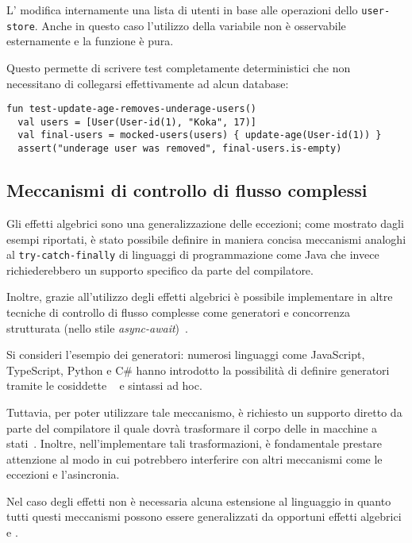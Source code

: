 L' modifica internamente una lista di utenti in base alle operazioni dello \lstinline{user-store}. Anche in questo caso l'utilizzo della variabile non è osservabile esternamente e la funzione è pura.

Questo permette di scrivere test completamente deterministici che non necessitano di collegarsi effettivamente ad alcun database:
\begin{lstlisting}[language=koka]
fun test-update-age-removes-underage-users()
  val users = [User(User-id(1), "Koka", 17)]
  val final-users = mocked-users(users) { update-age(User-id(1)) }
  assert("underage user was removed", final-users.is-empty)
\end{lstlisting}

\subsection{Meccanismi di controllo di flusso complessi}
Gli effetti algebrici sono una generalizzazione delle eccezioni; come mostrato dagli esempi riportati, è stato possibile definire in maniera concisa meccanismi analoghi al \lstinline{try-catch-finally} di linguaggi di programmazione come Java che invece richiederebbero un supporto specifico da parte del compilatore.

Inoltre, grazie all'utilizzo degli effetti algebrici è possibile implementare in  altre tecniche di controllo di flusso complesse come generatori e concorrenza strutturata (nello stile \emph{async-await})~\cite{cit:structured-asynchrony-with-algebraic-effects}.

Si consideri l'esempio dei generatori: numerosi linguaggi come JavaScript, TypeScript, Python e C\# hanno introdotto la possibilità di definire generatori tramite le cosiddette ~\cite{cit:yield-statement-c-sharp,cit:yield-statement-javascript,cit:yield-statement-python} e sintassi ad hoc.

Tuttavia, per poter utilizzare tale meccanismo, è richiesto un supporto diretto da parte del compilatore il quale dovrà trasformare il corpo delle  in macchine a stati~\cite{cit:iterators-technical-implementation}. Inoltre, nell'implementare tali trasformazioni, è fondamentale prestare attenzione al modo in cui potrebbero interferire con altri meccanismi come le eccezioni e l'asincronia.

Nel caso degli effetti non è necessaria alcuna estensione al linguaggio in quanto tutti questi meccanismi possono essere generalizzati da opportuni effetti algebrici e .

